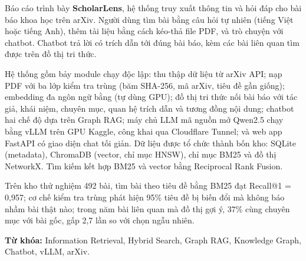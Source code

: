 
Báo cáo trình bày \textbf{ScholarLens}, hệ thống truy xuất thông tin và hỏi đáp cho bài báo khoa học trên arXiv.
Người dùng tìm bài bằng câu hỏi tự nhiên (tiếng Việt hoặc tiếng Anh), thêm tài liệu bằng cách kéo-thả file PDF,
và trò chuyện với chatbot. Chatbot trả lời có trích dẫn tới đúng bài báo, kèm các bài liên quan tìm được trên đồ thị
tri thức.

Hệ thống gồm bảy module chạy độc lập: thu thập dữ liệu từ arXiv API; nạp PDF với ba lớp kiểm tra trùng (băm
SHA-256, mã arXiv, tiêu đề gần giống); embedding đa ngôn ngữ bằng  (tự dùng GPU); đồ thị
tri thức nối bài báo với tác giả, khái niệm, chuyên mục, quan hệ trích dẫn và tương đồng nội dung; chatbot hai chế
độ dựa trên Graph RAG; máy chủ LLM mã nguồn mở Qwen2.5 chạy bằng vLLM trên GPU Kaggle, công khai qua Cloudflare
Tunnel; và web app FastAPI có giao diện chat tối giản. Dữ liệu được tổ chức thành bốn kho: SQLite (metadata),
ChromaDB (vector, chỉ mục HNSW), chỉ mục BM25 và đồ thị NetworkX. Tìm kiếm kết hợp BM25 và vector bằng Reciprocal
Rank Fusion.

Trên kho thử nghiệm 492 bài, tìm bài theo tiêu đề bằng BM25 đạt Recall@1 = 0,957; cơ chế kiểm tra trùng phát hiện
95\% tiêu đề bị biến đổi mà không báo nhầm bài thật nào; trong năm bài liên quan mà đồ thị gợi ý, 37\% cùng chuyên
mục với bài gốc, gấp 2,7 lần so với chọn ngẫu nhiên.

\textbf{Từ khóa:} Information Retrieval, Hybrid Search, Graph RAG, Knowledge Graph, Chatbot, vLLM, arXiv.

